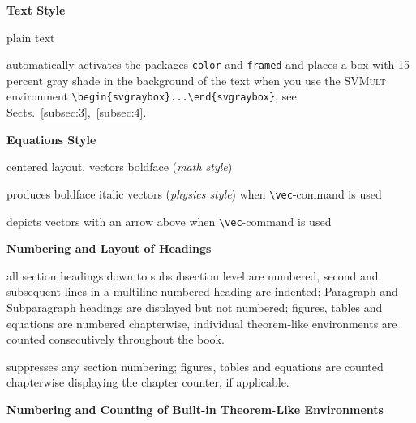 \documentclass[graybox]{svmult}
\begin{document}
\begin{refguide}
\begin{sloppy}
\textbf{Text Style}

\begin{description}
\item[\textit{default}] plain text
\item[\textit{graybox}] automatically activates the packages \verb|color| and \verb|framed| and places a box with 15 percent gray shade in the background of the text when you use the \textsc{SVMult} environment \verb|\begin{svgraybox}...\end{svgraybox}|, see Sects.~\ref{subsec:3},~\ref{subsec:4}.
\end{description}


\textbf{Equations Style}

\begin{description}
\item[\textit{default}] centered layout, vectors boldface (\textit{math style})
\item[\textit{vecphys}] produces boldface italic vectors (\textit{physics style}) when \verb|\vec|-command is used
\item[\textit{vecarrow}] depicts vectors with an arrow above when \verb|\vec|-command is used
\end{description}


\textbf{Numbering and Layout of Headings}

\begin{description}
\item[\textit{default}] all section headings down to subsubsection level are numbered, second and subsequent lines in a multiline numbered heading are indented; Paragraph and Subparagraph headings are displayed but not numbered; figures, tables and equations are numbered chapterwise, individual theorem-like environments are counted consecutively throughout the book.
\item[\textit{nosecnum}] suppresses any section numbering; figures, tables and equations are counted chapterwise displaying the chapter counter, if applicable.
\end{description}


\textbf{Numbering and Counting of Built-in Theorem-Like Environments}


\end{sloppy}
\end{refguide}
\end{document}
